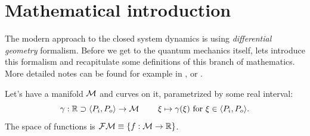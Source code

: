 \chapter{Mathematical introduction}
The modern approach to the closed system dynamics is using \emph{differential geometry} formalism. Before we get to the quantum mechanics itself, lets introduce this formalism and recapitulate some definitions of this branch of mathematics. More detailed notes can be found for example in \citep{fecko}, or .

Let's have a manifold $\mathcal{M}$ and curves on it, parametrized by some real interval:
$$\gamma:\mathbb{R} \supset \langle P_i,P_o\rangle \rightarrow \mathcal{M}\; \qquad \xi\mapsto \gamma(\xi) \text{  for } \xi \in \langle P_i,P_o\rangle .$$ 
The space of functions is $\mathcal{FM}\equiv\{f:\mathcal{M}\rightarrow \mathbb{R}\}$.


